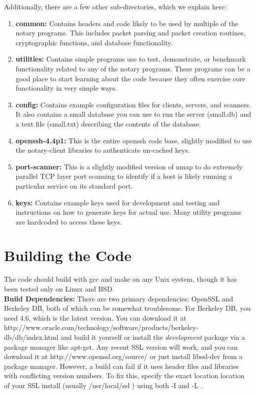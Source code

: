 \documentclass[pdftex,singlecolumn,11pt,letterpaper]{article}
\begin{document}
\noindent 
Additionally, there are a few other sub-directories, which we explain here:
\begin{enumerate}
\item \textbf{common:}  Contains headers and code likely to be used 
by multiple
of the notary programs.  This includes packet parsing and packet creation 
routines, cryptographic functions, and database functionality.  
\item \textbf{utilities:} Contains simple programs use to test, demonstrate,
or benchmark functionality related to any of the notary programs.  These 
programs can be a good place to start learning about the code because they 
often exercise core functionality in very simple ways. 
\item \textbf{config:} Contains example configuration files for clients, 
servers, and scanners.  It also contains a small database you can use to
run the server (small.db) and a text file (small.txt) describing the 
contents of the database.  
\item \textbf{openssh-4.4p1:}  This is the entire openssh code base, slightly
modified to use the notary-client libraries to authenticate un-cached keys.  
\item \textbf{port-scanner:} This is a slightly modified version of nmap to 
do extremely parallel TCP layer port scanning to identify if a host is likely
running a particular service on its standard port.  
\item \textbf{keys:} Contains example keys used for development and testing 
and instructions on how to generate keys for actual use.  Many utility 
programs are hardcoded to access these keys.   
\end{enumerate}

\section{Building the Code}

The code should build with gcc and make on any Unix system, though it has
been tested only on Linux and BSD. \\  

\noindent\textbf{Build Dependencies:} There are two primary dependencies:
OpenSSL and Berkeley DB, both of which can be somewhat troublesome.   
For Berkeley DB, you need 4.6, which is the latest version.  You can 
download it at http://www.oracle.com/technology/software/products/berkeley-db/db/index.html and build it yourself or install the \emph{development} package
via a package manager like apt-get.  Any recent SSL version will work, and
you can download it at http://www.openssl.org/source/ or just install 
libssl-dev from a package manager.  However, a build
can fail if it uses header files and libraries with conflicting version 
numbers.  To fix this, specify the exact location location of your SSL 
install (usually /usr/local/ssl ) using both -I and -L . \\ 
\end{document}
